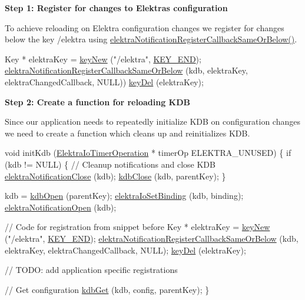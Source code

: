 {\bfseries Step 1\+: Register for changes to Elektra\textquotesingle{}s configuration}

To achieve reloading on Elektra configuration changes we register for changes below the key {\ttfamily /elektra} using {\ttfamily \hyperlink{group__kdbnotification_ga374edd4f4fff527d6511ce4d0df62681}{elektra\+Notification\+Register\+Callback\+Same\+Or\+Below()}}.


\begin{DoxyCode}
Key * elektraKey = \hyperlink{group__key_gad23c65b44bf48d773759e1f9a4d43b89}{keyNew} (\textcolor{stringliteral}{"/elektra"}, \hyperlink{group__key_gga9b703ca49f48b482def322b77d3e6bc8aa8adb6fcb92dec58fb19410eacfdd403}{KEY\_END});
\hyperlink{group__kdbnotification_ga374edd4f4fff527d6511ce4d0df62681}{elektraNotificationRegisterCallbackSameOrBelow} (kdb, 
      elektraKey, elektraChangedCallback, NULL))
\hyperlink{group__key_ga3df95bbc2494e3e6703ece5639be5bb1}{keyDel} (elektraKey);
\end{DoxyCode}


{\bfseries Step 2\+: Create a function for reloading K\+DB}

Since our application needs to repeatedly initialize K\+DB on configuration changes we need to create a function which cleans up and reinitializes K\+DB.


\begin{DoxyCode}
\textcolor{keywordtype}{void} initKdb (\hyperlink{kdbio_8h_a09c40c890207a8244fc39bb930fee1fa}{ElektraIoTimerOperation} * timerOp ELEKTRA\_UNUSED)
\{
        \textcolor{keywordflow}{if} (kdb != NULL)
        \{
                \textcolor{comment}{// Cleanup notifications and close KDB}
                \hyperlink{group__kdbnotification_ga5685dafbd4131011365628d6d9213594}{elektraNotificationClose} (kdb);
                \hyperlink{group__kdb_gadb54dc9fda17ee07deb9444df745c96f}{kdbClose} (kdb, parentKey);
        \}

        kdb = \hyperlink{group__kdb_ga6808defe5870f328dd17910aacbdc6ca}{kdbOpen} (parentKey);
        \hyperlink{group__kdbio_ga187345483bdfbb404919c6797bc2db77}{elektraIoSetBinding} (kdb, binding);
        \hyperlink{group__kdbnotification_gaeae96154abdb5fdbf1b34a01e2b23e44}{elektraNotificationOpen} (kdb);

        \textcolor{comment}{// Code for registration from snippet before}
        Key * elektraKey = \hyperlink{group__key_gad23c65b44bf48d773759e1f9a4d43b89}{keyNew} (\textcolor{stringliteral}{"/elektra"}, \hyperlink{group__key_gga9b703ca49f48b482def322b77d3e6bc8aa8adb6fcb92dec58fb19410eacfdd403}{KEY\_END});
        \hyperlink{group__kdbnotification_ga374edd4f4fff527d6511ce4d0df62681}{elektraNotificationRegisterCallbackSameOrBelow} (kdb, 
      elektraKey, elektraChangedCallback, NULL);
        \hyperlink{group__key_ga3df95bbc2494e3e6703ece5639be5bb1}{keyDel} (elektraKey);

        \textcolor{comment}{// TODO: add application specific registrations}

        \textcolor{comment}{// Get configuration}
        \hyperlink{group__kdb_ga28e385fd9cb7ccfe0b2f1ed2f62453a1}{kdbGet} (kdb, config, parentKey);
\}
\end{DoxyCode}


